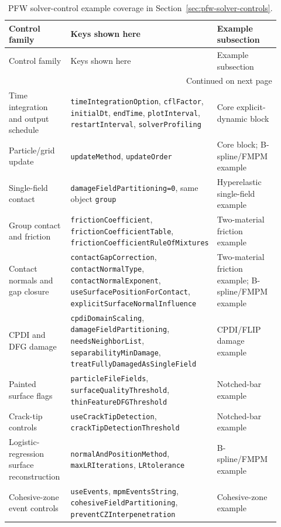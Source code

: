 {\renewcommand{\arraystretch}{1.12}
\footnotesize
\begin{longtable}{@{}p{0.30\linewidth}p{0.26\linewidth}p{0.36\linewidth}@{}}
\caption{PFW solver-control example coverage in Section~\ref{sec:pfw-solver-controls}.}\label{tab:pfw-control-coverage}\\
\toprule
Control family & Keys shown here & Example subsection\\
\midrule
\endfirsthead
\toprule
Control family & Keys shown here & Example subsection\\
\midrule
\endhead
\midrule
\multicolumn{3}{r}{Continued on next page}\\
\endfoot
\bottomrule
\endlastfoot
Time integration and output schedule & \texttt{timeIntegrationOption}, \texttt{cflFactor}, \texttt{initialDt}, \texttt{endTime}, \texttt{plotInterval}, \texttt{restartInterval}, \texttt{solverProfiling} & Core explicit-dynamic block\\
Particle/grid update & \texttt{updateMethod}, \texttt{updateOrder} & Core block; B-spline/FMPM example\\
Single-field contact & \texttt{damageFieldPartitioning=0}, same object \texttt{group} & Hyperelastic single-field example\\
Group contact and friction & \texttt{frictionCoefficient}, \texttt{frictionCoefficientTable}, \texttt{frictionCoefficientRuleOfMixtures} & Two-material friction example\\
Contact normals and gap closure & \texttt{contactGapCorrection}, \texttt{contactNormalType}, \texttt{contactNormalExponent}, \texttt{useSurfacePositionForContact}, \texttt{explicitSurfaceNormalInfluence} & Two-material friction example; B-spline/FMPM example\\
CPDI and DFG damage & \texttt{cpdiDomainScaling}, \texttt{damageFieldPartitioning}, \texttt{needsNeighborList}, \texttt{separabilityMinDamage}, \texttt{treatFullyDamagedAsSingleField} & CPDI/FLIP damage example\\
Painted surface flags & \texttt{particleFileFields}, \texttt{surfaceQualityThreshold}, \texttt{thinFeatureDFGThreshold} & Notched-bar example\\
Crack-tip controls & \texttt{useCrackTipDetection}, \texttt{crackTipDetectionThreshold} & Notched-bar example\\
Logistic-regression surface reconstruction & \texttt{normalAndPositionMethod}, \texttt{maxLRIterations}, \texttt{LRtolerance} & B-spline/FMPM example\\
Cohesive-zone event controls & \texttt{useEvents}, \texttt{mpmEventsString}, \texttt{cohesiveFieldPartitioning}, \texttt{preventCZInterpenetration} & Cohesive-zone example\\

\end{longtable}}
